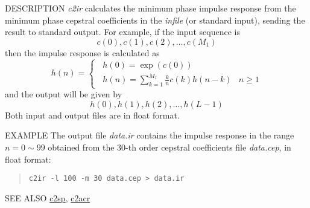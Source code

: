\begin{synopsis}
 \item[c2ir] [ --m $M_1$ ] [ --M $M_2$ ] [ --l $L$ ] [ --i ] [ {\em infile} ]
\end{synopsis}

\begin{qsection}{DESCRIPTION}
{\em c2ir} calculates the minimum phase impulse response 
from the minimum phase cepstral coefficients 
in the {\em infile} (or standard input), 
sending the result to standard output.
For example, if the input sequence is
\begin{displaymath}
   c(0),c(1),c(2),\dots,c(M_1)
\end{displaymath}
then the impulse response is calculated as
\begin{displaymath}
 h(n)= \begin{cases}
 \;\; h(0)=\exp(c(0)) & \\
 \;\; h(n)=\displaystyle \sum_{k=1}^{M_1} \frac{k}{n} c(k)h(n-k) & n \geq 1
 \end{cases}
\end{displaymath}
and the output will be given by
\begin{displaymath}
   h(0),h(1),h(2),\dots,h(L -1)
\end{displaymath}
Both input and output files are in float format.
\end{qsection}

\begin{options}
\end{options}

\begin{qsection}{EXAMPLE}
The output file {\em data.ir} contains the impulse response
in the range $n = 0 \sim 99$ obtained from the 30-th order cepstral
coefficients file {\em data.cep}, in float format:
 \begin{quote}
  \verb!c2ir -l 100 -m 30 data.cep > data.ir!
 \end{quote}
\end{qsection}

\begin{qsection}{SEE ALSO}
\hyperlink{c2sp}{c2sp},
\hyperlink{c2acr}{c2acr}
\end{qsection}
